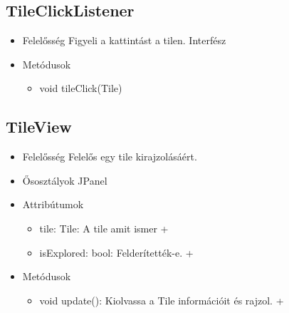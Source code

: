 \subsection{TileClickListener}
\begin{itemize}
	\item Felelősség\newline
	Figyeli a kattintást a tilen. Interfész
	\item Metódusok\newline
	\begin{itemize}
		\item void tileClick(Tile)
	\end{itemize}	
\end{itemize}

\subsection{TileView}
\begin{itemize}
	\item Felelősség\newline
	Felelős egy tile kirajzolásáért.
	\item Ősosztályok\newline
	JPanel
	\item Attribútumok\newline
	\begin{itemize}
		\item tile: Tile: A tile amit ismer +
		\item isExplored: bool: Felderítették-e. +
	\end{itemize}
	\item Metódusok\newline
	\begin{itemize}
		\item void update(): Kiolvassa a Tile információit és rajzol. +
	\end{itemize}
\end{itemize}

